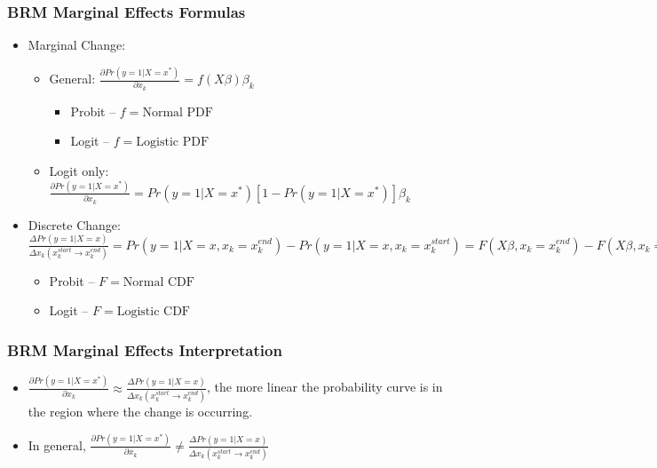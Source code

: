 \documentclass{beamer}
\begin{document}
\begin{frame}
	\frametitle{BRM Marginal Effects Formulas}
		\begin{itemize}
			\item Marginal Change: 
				\begin{itemize}
					\item General: $\frac{\partial Pr\left(y=1|X=x^{*}\right)}{\partial x_{k}}=f(X\beta)\beta_{k}$
						\begin{itemize}
							\item Probit -- $f=\mbox{Normal PDF}$
							\item Logit -- $f=\mbox{Logistic PDF}$
						\end{itemize}
					\item Logit only: $\frac{\partial Pr\left(y=1|X=x^{*}\right)}{\partial x_{k}}=Pr\left(y=1|X=x^{*}\right)\left[1-Pr\left(y=1|X=x^{*}\right)\right]\beta_{k}$
				\end{itemize}
			\item Discrete Change: $\frac{\Delta Pr\left(y=1|X=x\right)}{\Delta x_{k}\left(x^{start}_{k}\rightarrow x^{end}_{k}\right)}=Pr\left(y=1|X=x, x_{k}=x^{end}_{k}\right)-Pr\left(y=1|X=x, x_{k}=x^{start}_{k}\right)=F(X\beta, x_{k}=x^{end}_{k})-F(X\beta, x_{k}=x^{start}_{k})$
				\begin{itemize}
					\item Probit -- $F=\mbox{Normal CDF}$
					\item Logit -- $F=\mbox{Logistic CDF}$
				\end{itemize}
		\end{itemize}
\end{frame}

\begin{frame}
	\frametitle{BRM Marginal Effects Interpretation}
		\begin{itemize}
			\item $\frac{\partial Pr\left(y=1|X=x^{*}\right)}{\partial x_{k}}\approx\frac{\Delta Pr\left(y=1|X=x\right)}{\Delta x_{k}\left(x^{start}_{k}\rightarrow x^{end}_{k}\right)}$, the more linear the probability curve is in the region where the change is occurring.
			\item In general, $\frac{\partial Pr\left(y=1|X=x^{*}\right)}{\partial x_{k}}\neq\frac{\Delta Pr\left(y=1|X=x\right)}{\Delta x_{k}\left(x^{start}_{k}\rightarrow x^{end}_{k}\right)}$
		\end{itemize}
\end{frame}
\end{document}
